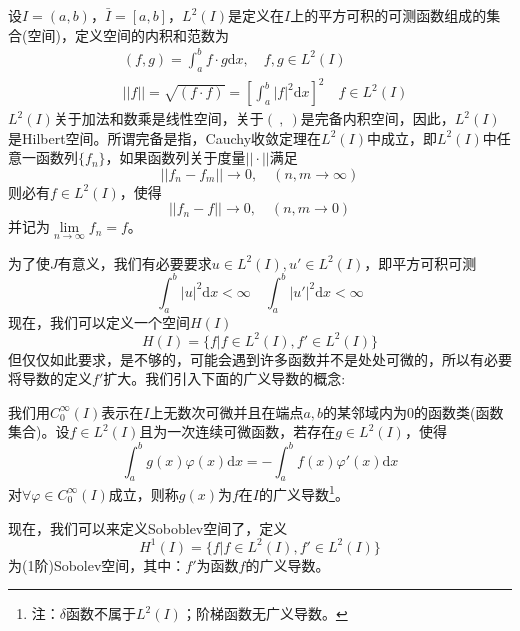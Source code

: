             \par
            设$I = (a,b)$，$\bar{I} = [a,b]$，$L^2(I)$是定义在$I$上的平方可积的可测函数组成的集合(空间)，定义空间的内积和范数为
            \begin{align*}
                &(f,g) = \int_a^b f \cdot g\mathrm{d} x, \quad f,g\in L^2(I)\\
                &||f|| = \sqrt{(f \cdot f)} = \left[ \int_a^b|f|^2 \mathrm{d} x \right]^2 \quad f\in L^2(I)
            \end{align*}
            $L^2(I)$关于加法和数乘是线性空间，关于$(\ ,\ )$是完备内积空间，因此，$L^2(I)$是Hilbert空间。所谓完备是指，Cauchy收敛定理在$L^2(I)$中成立，即$L^2(I)$中任意一函数列$\{f_n\}$，如果函数列关于度量$||\cdot||$满足
            \[
                ||f_n - f_m|| \rightarrow 0,\quad(n,m\rightarrow \infty)
            \]
            则必有$f\in L^2(I)$，使得
            \[
                ||f_n - f|| \rightarrow 0,\quad(n,m\rightarrow 0)
            \]
            并记为$\lim\limits_{n \rightarrow \infty } f_n = f$。
            \par
            为了使$J$有意义，我们有必要要求$u \in L^2(I), u'\in L^2(I)$，即平方可积可测
            \[
                \int_a^b |u|^2 \mathrm{d} x < \infty \quad \int_a^b |u'|^2 \mathrm{d} x < \infty
            \]
            现在，我们可以定义一个空间$H(I)$
            \[
                H(I) = \{f|f\in L^2(I) , f'\in L^2(I) \}
            \]
            但仅仅如此要求，是不够的，可能会遇到许多函数并不是处处可微的，所以有必要将导数的定义$f'$扩大。我们引入下面的广义导数的概念:
            \begin{definition}[广义导数]
            我们用$C_0^{\infty}(I)$表示在$I$上无数次可微并且在端点$a,b$的某邻域内为0的函数类(函数集合)。设$f \in L^2(I)$且为一次连续可微函数，若存在$g\in L^2(I)$，使得
            \[
                \int_a^b g(x)\varphi (x) \mathrm{d} x = - \int_a^b f(x)\varphi' (x) \mathrm{d} x
            \]
            对$\forall \varphi \in C_0^{\infty}(I)$成立，则称$g(x)$为$f$在$I$的广义导数\footnote{注：$\delta $函数不属于$L^2(I)$；阶梯函数无广义导数。}。
            \end{definition}
            \begin{definition}[Sobolev空间]
            现在，我们可以来定义Soboblev空间了，定义
            \[
                H^1(I) = \{f|f\in L^2(I) , f'\in L^2(I) \}
            \]
            为(1阶)Sobolev空间，其中：$f'$为函数$f$的广义导数。
            \end{definition}
            \par
